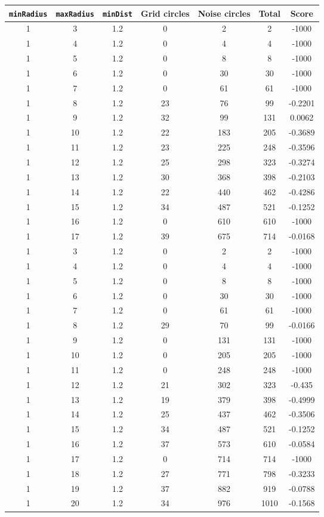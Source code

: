 \documentclass[letterpaper, 12pt]{article}
\begin{document}
\begin{longtable}{|c|c|c|c|c|c|c|}
\hline
\textbf{\texttt{minRadius}} & \textbf{\texttt{maxRadius}} & \textbf{\texttt{minDist}} & \textbf{Grid circles} & \textbf{Noise circles} & \textbf{Total} & \textbf{Score} \\
\hline
1 & 3 & 1.2 & 0 & 2 & 2 & -1000 \\
\hline
1 & 4 & 1.2 & 0 & 4 & 4 & -1000 \\
\hline
1 & 5 & 1.2 & 0 & 8 & 8 & -1000 \\
\hline
1 & 6 & 1.2 & 0 & 30 & 30 & -1000 \\
\hline
1 & 7 & 1.2 & 0 & 61 & 61 & -1000 \\
\hline
1 & 8 & 1.2 & 23 & 76 & 99 & -0.2201 \\
\hline
1 & 9 & 1.2 & 32 & 99 & 131 & 0.0062 \\
\hline
1 & 10 & 1.2 & 22 & 183 & 205 & -0.3689 \\
\hline
1 & 11 & 1.2 & 23 & 225 & 248 & -0.3596 \\
\hline
1 & 12 & 1.2 & 25 & 298 & 323 & -0.3274 \\
\hline
1 & 13 & 1.2 & 30 & 368 & 398 & -0.2103 \\
\hline
1 & 14 & 1.2 & 22 & 440 & 462 & -0.4286 \\
\hline
1 & 15 & 1.2 & 34 & 487 & 521 & -0.1252 \\
\hline
1 & 16 & 1.2 & 0 & 610 & 610 & -1000 \\
\hline
1 & 17 & 1.2 & 39 & 675 & 714 & -0.0168 \\
\hline
1 & 3 & 1.2 & 0 & 2 & 2 & -1000 \\
\hline
1 & 4 & 1.2 & 0 & 4 & 4 & -1000 \\
\hline
1 & 5 & 1.2 & 0 & 8 & 8 & -1000 \\
\hline
1 & 6 & 1.2 & 0 & 30 & 30 & -1000 \\
\hline
1 & 7 & 1.2 & 0 & 61 & 61 & -1000 \\
\hline
1 & 8 & 1.2 & 29 & 70 & 99 & -0.0166 \\
\hline
1 & 9 & 1.2 & 0 & 131 & 131 & -1000 \\
\hline
1 & 10 & 1.2 & 0 & 205 & 205 & -1000 \\
\hline
1 & 11 & 1.2 & 0 & 248 & 248 & -1000 \\
\hline
1 & 12 & 1.2 & 21 & 302 & 323 & -0.435 \\
\hline
1 & 13 & 1.2 & 19 & 379 & 398 & -0.4999 \\
\hline
1 & 14 & 1.2 & 25 & 437 & 462 & -0.3506 \\
\hline
1 & 15 & 1.2 & 34 & 487 & 521 & -0.1252 \\
\hline
1 & 16 & 1.2 & 37 & 573 & 610 & -0.0584 \\
\hline
1 & 17 & 1.2 & 0 & 714 & 714 & -1000 \\
\hline
1 & 18 & 1.2 & 27 & 771 & 798 & -0.3233 \\
\hline
1 & 19 & 1.2 & 37 & 882 & 919 & -0.0788 \\
\hline
1 & 20 & 1.2 & 34 & 976 & 1010 & -0.1568 \\
\hline
\end{longtable}
\end{document}
